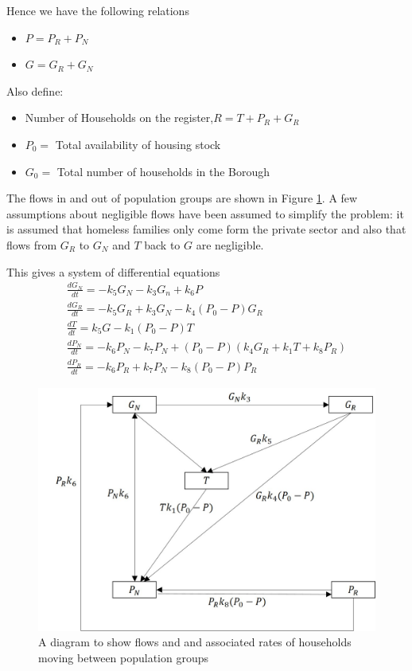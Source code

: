 \documentclass[11pt]{article} %
\begin{document}
Hence we have the following relations 
\begin{itemize}
	\item $ P=P_R+P_N $
	\item $ G=G_R+G_N $
	
\end{itemize}

Also define: 
\begin{itemize}
	\item Number of Households on the register,$  R=T+P_R+G_R $
	\item $ P_0 = $ Total availability of housing stock 
	\item $ G_0= $ Total number of households in the Borough
\end{itemize}

The flows in and out of population groups are shown in Figure \ref{fig:homelessrates}. A few assumptions about negligible flows have been assumed to simplify the problem: it is assumed that homeless families only come form the private sector and also that flows from $ G_R $ to $ G_N $ and $ T $ back to $ G $ are negligible. 

This gives a system of differential equations
\begin{eqnarray}
\frac{dG_N}{dt}=-k_5 G_N-k_3 G_n +k_6 P\\
\frac{dG_R}{dt}=-k_5 G_R +k_3 G_N -k_4 (P_0-P)G_R\\
\frac{dT}{dt}=k_5 G -k_1(P_0 -P)T\\
\frac{dP_N}{dt}=-k_6 P_N -k_7 P_N +(P_0-P)(k_4 G_R +k_1 T+k_8 P_R)\\
\frac{dP_R}{dt}=-k_6 P_R+k_7 P_N -k_8(P_0-P)P_R
\end{eqnarray}
	 \begin{figure}
	 	\centering
	 	\includegraphics[width=0.9\linewidth]{Report_images/homeless_rates}
	 	
	 	\caption{A diagram to show  flows and and associated rates of households moving  between population groups}
	 	\label{fig:homelessrates}
	 \end{figure}
	 
\end{document}
